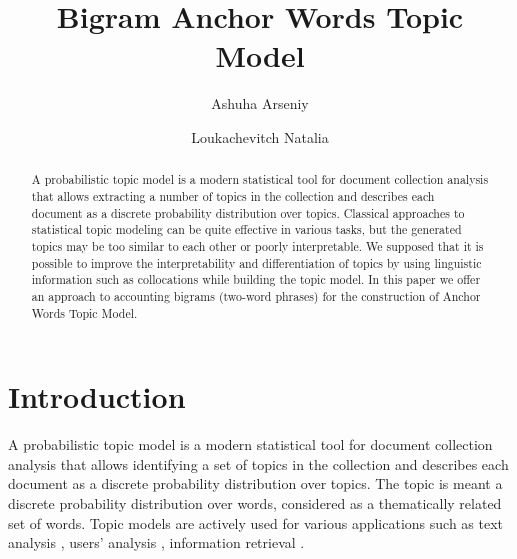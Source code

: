 \documentclass[runningheads,a4paper]{llncs}
\begin{document}
	\title{Bigram Anchor Words Topic Model}
	
	\author{
		Ashuha Arseniy
		\and
		Loukachevitch Natalia
	}
	

	
	\maketitle
	
	\begin{abstract}
		A probabilistic topic model is a modern statistical tool for document collection analysis that allows extracting a number of topics in the collection and describes each document as a discrete probability distribution over topics. Classical approaches to statistical topic modeling can be quite effective in various tasks, but the generated topics may be too similar to each other or poorly interpretable. We supposed that it is possible to improve the interpretability and differentiation of topics by using linguistic information such as collocations while building the topic model. In this paper we offer an approach to accounting bigrams (two-word phrases) for the construction of Anchor Words Topic Model.
	\end{abstract}
	
	\section{Introduction}   
A probabilistic topic model is a modern statistical tool for document collection analysis that allows identifying a set of topics in the collection and  describes each document as a discrete probability distribution over topics. The topic is meant a discrete probability distribution over words, considered as a thematically related set of words. Topic models are actively used for various applications such as text analysis \cite{gao2012joint,nokel2015topic,cheng2014btm}, users' analysis \cite{krestel2009latent}, information retrieval \cite{mei2008topic,vorontsov2014additive}. 
\end{document}
